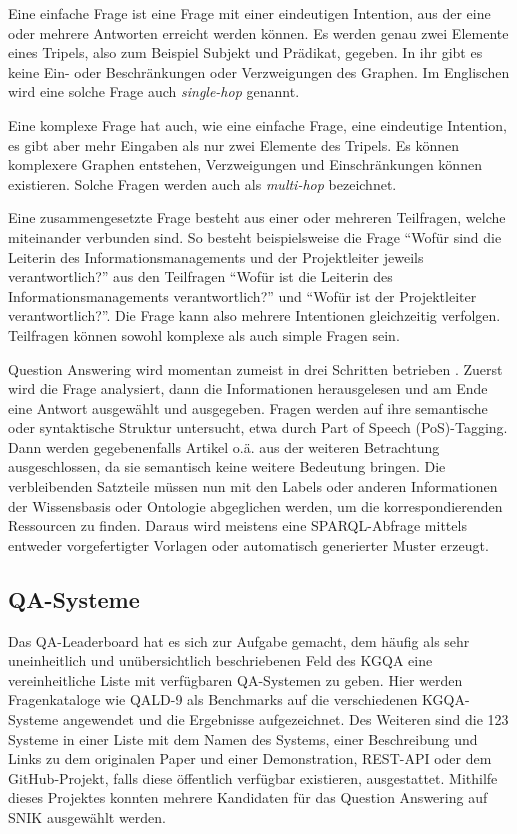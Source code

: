 \documentclass[utf8,biblatex]{lni}
\begin{document}
Eine einfache Frage ist eine Frage mit einer eindeutigen Intention, aus der eine oder mehrere Antworten erreicht werden können.
Es werden genau zwei Elemente eines Tripels, also zum Beispiel Subjekt und Prädikat, gegeben.
In ihr gibt es keine Ein- oder Beschränkungen oder Verzweigungen des Graphen.
Im Englischen wird eine solche Frage auch \emph{single-hop} genannt.

Eine komplexe Frage hat auch, wie eine einfache Frage, eine eindeutige Intention, es gibt aber mehr Eingaben als nur zwei Elemente des Tripels.
Es können komplexere Graphen entstehen, Verzweigungen und Einschränkungen können existieren.
Solche Fragen werden auch als \emph{multi-hop} bezeichnet.

Eine zusammengesetzte Frage besteht aus einer oder mehreren Teilfragen, welche miteinander verbunden sind.
So besteht beispielsweise die Frage \enquote{Wofür sind die Leiterin des Informationsmanagements und der Projektleiter jeweils verantwortlich?} aus den Teilfragen
\enquote{Wofür ist die Leiterin des Informationsmanagements verantwortlich?} und \enquote{Wofür ist der Projektleiter verantwortlich?}.
Die Frage kann also mehrere Intentionen gleichzeitig verfolgen.
Teilfragen können sowohl komplexe als auch simple Fragen sein.

Question Answering wird momentan zumeist in drei Schritten betrieben \cite{ckbqasurvey, muheqa}.
Zuerst wird die Frage analysiert, dann die Informationen herausgelesen und am Ende eine Antwort ausgewählt und ausgegeben.
Fragen werden auf ihre semantische oder syntaktische Struktur untersucht, etwa durch Part of Speech (PoS)-Tagging.
Dann werden gegebenenfalls Artikel o.ä. aus der weiteren Betrachtung ausgeschlossen, da sie semantisch keine weitere Bedeutung bringen.
Die verbleibenden Satzteile müssen nun mit den Labels oder anderen Informationen der Wissensbasis oder Ontologie abgeglichen werden, um die korrespondierenden Ressourcen zu finden.
Daraus wird meistens eine SPARQL-Abfrage mittels entweder vorgefertigter Vorlagen oder automatisch generierter Muster erzeugt.

\subsection{QA-Systeme}

Das QA-Leaderboard \citep{kgqaleaderboard} hat es sich zur Aufgabe gemacht,
dem häufig als sehr uneinheitlich und unübersichtlich \citep{diefenbachkbqa} beschriebenen Feld des KGQA eine vereinheitliche Liste mit verfügbaren QA-Systemen zu geben.
Hier werden Fragenkataloge wie QALD-9 als Benchmarks auf die verschiedenen KGQA-Systeme angewendet und die Ergebnisse aufgezeichnet.
Des Weiteren sind die 123 Systeme in einer Liste mit dem Namen des Systems, einer Beschreibung und Links zu dem originalen Paper und einer Demonstration,
REST-API oder dem GitHub-Projekt, falls diese öffentlich verfügbar existieren, ausgestattet.
Mithilfe dieses Projektes konnten mehrere Kandidaten für das Question Answering auf SNIK ausgewählt werden.
\end{document}
